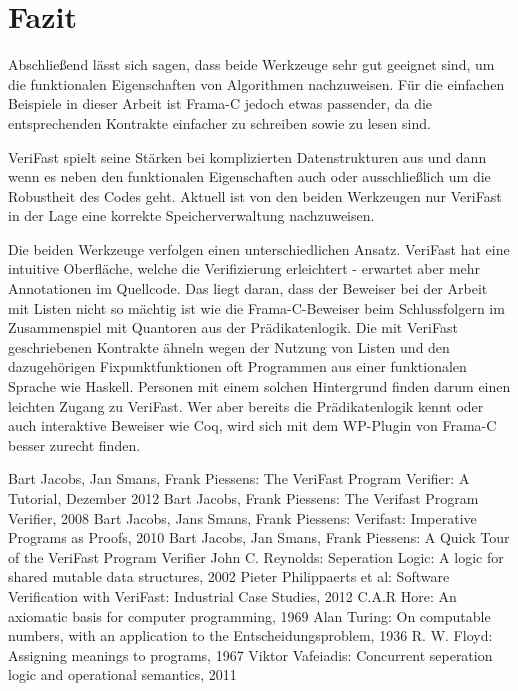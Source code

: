 ﻿\chapter{Fazit}

Abschließend lässt sich sagen, dass beide Werkzeuge sehr gut geeignet sind, um die funktionalen Eigenschaften von
Algorithmen nachzuweisen. Für die einfachen Beispiele in dieser Arbeit ist Frama-C jedoch etwas passender, da die
entsprechenden Kontrakte einfacher zu schreiben sowie zu lesen sind.

VeriFast spielt seine Stärken bei komplizierten Datenstrukturen aus und dann wenn es neben den funktionalen Eigenschaften
auch oder ausschließlich um die Robustheit des Codes geht. Aktuell ist von den beiden Werkzeugen nur VeriFast in der Lage
eine korrekte Speicherverwaltung nachzuweisen.

Die beiden Werkzeuge verfolgen einen unterschiedlichen Ansatz. VeriFast hat eine intuitive Oberfläche, welche die Verifizierung
erleichtert - erwartet aber mehr Annotationen im Quellcode. Das liegt daran, dass der Beweiser bei der Arbeit mit Listen
nicht so mächtig ist wie die Frama-C-Beweiser beim Schlussfolgern im Zusammenspiel mit Quantoren aus der Prädikatenlogik.
Die mit VeriFast geschriebenen Kontrakte ähneln wegen der Nutzung von Listen und den dazugehörigen Fixpunktfunktionen
oft Programmen aus einer funktionalen Sprache wie Haskell. Personen mit einem solchen Hintergrund finden darum einen leichten Zugang zu
VeriFast. Wer aber bereits die Prädikatenlogik kennt oder auch interaktive Beweiser wie Coq, wird sich mit
dem WP-Plugin von Frama-C besser zurecht finden.


\begin{thebibliography}{}
 Bart Jacobs, Jan Smans, Frank Piessens: The VeriFast Program Verifier: A Tutorial, Dezember 2012
 Bart Jacobs, Frank Piessens: The Verifast Program Verifier, 2008
 Bart Jacobs, Jans Smans, Frank Piessens: Verifast: Imperative Programs as Proofs, 2010
 Bart Jacobs, Jan Smans, Frank Piessens: A Quick Tour of the VeriFast Program Verifier
 John C. Reynolds: Seperation Logic: A logic for shared mutable data structures, 2002
 Pieter Philippaerts et al: Software Verification with VeriFast: Industrial Case Studies, 2012
 C.A.R Hore: An axiomatic basis for computer programming, 1969
 Alan Turing: On computable numbers, with an application to the Entscheidungsproblem, 1936
 R. W. Floyd: Assigning meanings to programs, 1967
 Viktor Vafeiadis: Concurrent seperation logic and operational semantics, 2011
\end{thebibliography}
